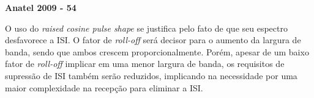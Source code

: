 \textbf{Anatel 2009 - 54}

O uso do \textit{raised cosine pulse shape} se justifica pelo fato de que seu espectro desfavorece a ISI. O fator de \textit{roll-off} será decisor para o aumento da largura de banda, sendo que ambos crescem proporcionalmente. Porém, apesar de um baixo fator de \textit{roll-off} implicar em uma menor largura de banda, os requisitos de supressão de ISI também serão reduzidos, implicando na necessidade por uma maior complexidade na recepção para eliminar a ISI.